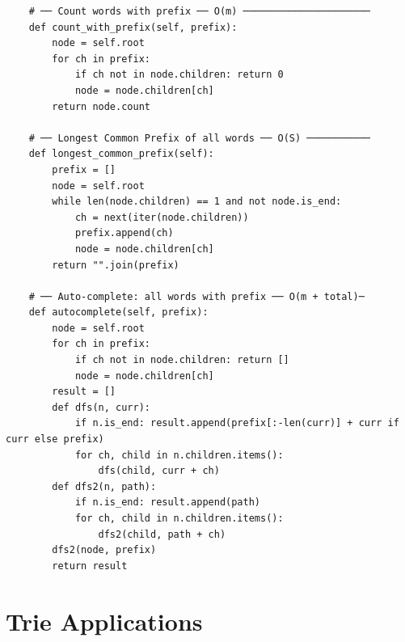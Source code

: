 \documentclass[11pt,a4paper]{report}
\begin{document}
\begin{lstlisting}
    # ── Count words with prefix ── O(m) ──────────────────────
    def count_with_prefix(self, prefix):
        node = self.root
        for ch in prefix:
            if ch not in node.children: return 0
            node = node.children[ch]
        return node.count

    # ── Longest Common Prefix of all words ── O(S) ───────────
    def longest_common_prefix(self):
        prefix = []
        node = self.root
        while len(node.children) == 1 and not node.is_end:
            ch = next(iter(node.children))
            prefix.append(ch)
            node = node.children[ch]
        return "".join(prefix)

    # ── Auto-complete: all words with prefix ── O(m + total)─
    def autocomplete(self, prefix):
        node = self.root
        for ch in prefix:
            if ch not in node.children: return []
            node = node.children[ch]
        result = []
        def dfs(n, curr):
            if n.is_end: result.append(prefix[:-len(curr)] + curr if curr else prefix)
            for ch, child in n.children.items():
                dfs(child, curr + ch)
        def dfs2(n, path):
            if n.is_end: result.append(path)
            for ch, child in n.children.items():
                dfs2(child, path + ch)
        dfs2(node, prefix)
        return result
\end{lstlisting}

\section{Trie Applications}
\end{document}
